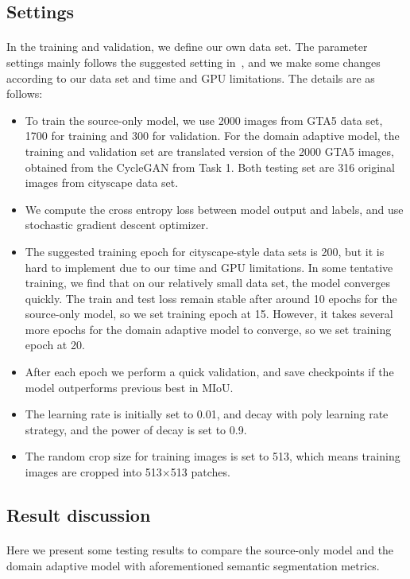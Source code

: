 \subsection{Settings}
\paragraph{}
In the training and validation, we define our own data set. The parameter settings mainly follows the suggested setting in~\cite{Deeplab}, and we make some changes according to our data set and time and GPU limitations. The details are as follows:
\begin{itemize}
    \item To train the source-only model, we use 2000 images from GTA5 data set, 1700 for training and 300 for validation. For the domain adaptive model, the training and validation set are translated version of the 2000 GTA5 images, obtained from the CycleGAN from Task 1. Both testing set are 316 original images from cityscape data set.
    \item We compute the cross entropy loss between model output and labels, and use stochastic gradient descent optimizer.
    \item The suggested training epoch for cityscape-style data sets is 200, but it is hard to implement due to our time and GPU limitations. In some tentative training, we find that on our relatively small data set, the model converges quickly. The train and test loss remain stable after around 10 epochs for the source-only model, so we set training epoch at 15. However, it takes several more epochs for the domain adaptive model to converge, so we set training epoch at 20. 
    \item After each epoch we perform a quick validation, and save checkpoints if the model outperforms previous best in MIoU.
    \item The learning rate is initially set to 0.01, and decay with poly learning rate strategy, and the power of decay is set to 0.9.
    \item The random crop size for training images is set to 513, which means training images are cropped into 513$\times$513 patches.
\end{itemize}
\subsection{Result discussion}
\paragraph{}
Here we present some testing results to compare the source-only model and the domain adaptive model with aforementioned semantic segmentation metrics.

